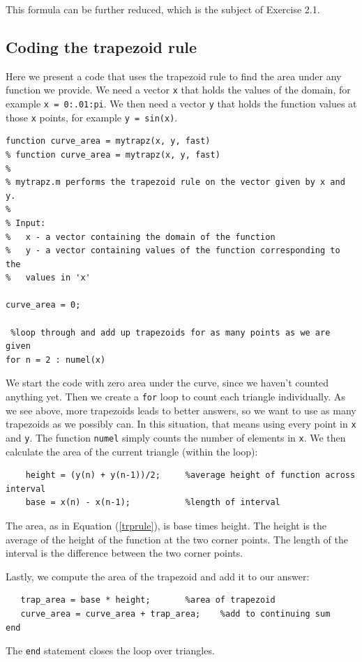 \documentclass{article}
\begin{document}
This formula can be further reduced, which is the subject of Exercise 2.1.  

\subsection{Coding the trapezoid rule}
Here we present a code that uses the trapezoid rule to find the area under any function we provide.  We need a vector {\tt x} that holds the values of the domain, for example {\tt x = 0:.01:pi}.  We then need a vector {\tt y} that holds the function values at those {\tt x} points, for example {\tt y = sin(x)}.  

\begin{verbatim}
function curve_area = mytrapz(x, y, fast)
% function curve_area = mytrapz(x, y, fast)
%
% mytrapz.m performs the trapezoid rule on the vector given by x and y.
%
% Input:
%   x - a vector containing the domain of the function
%   y - a vector containing values of the function corresponding to the
%   values in 'x'

curve_area = 0;
    
 %loop through and add up trapezoids for as many points as we are given
for n = 2 : numel(x)
\end{verbatim}

We start the code with zero area under the curve, since we haven't counted anything yet.  Then we create a {\tt for} loop to count each triangle individually.  As we see above, more trapezoids leads to better answers, so we want to use as many trapezoids as we possibly can.  In this situation, that means using every point in {\tt x} and {\tt y}.  The function {\tt numel} simply counts the number of elements in {\tt x}.  We then calculate the area of the current triangle (within the loop):

\begin{verbatim}
    height = (y(n) + y(n-1))/2;     %average height of function across interval
    base = x(n) - x(n-1);      	    %length of interval
\end{verbatim}
The area, as in Equation (\ref{trprule}), is base times height.  The height is the average of the height of the function at the two corner points.  The length of the interval is the difference between the two corner points.

Lastly, we compute the area of the trapezoid and add it to our answer:
\begin{verbatim}
   trap_area = base * height; 	    %area of trapezoid
   curve_area = curve_area + trap_area;    %add to continuing sum
end
\end{verbatim}
The {\tt end} statement closes the loop over triangles.\\
\end{document}
